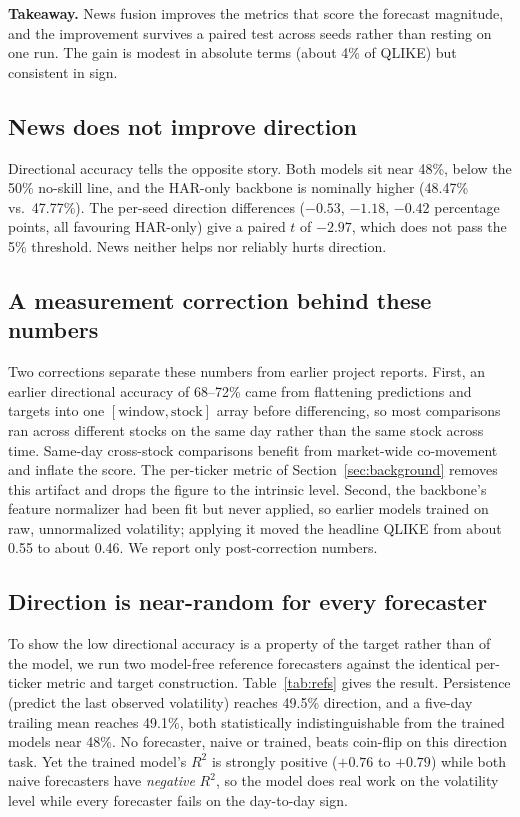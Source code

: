 \documentclass[runningheads]{llncs}
\newcommand{\diraccHAR}{48.47}
\newcommand{\diraccNews}{47.77}
\newcommand{\diracctstat}{-2.97}
\begin{document}
\smallskip
\noindent\textbf{Takeaway.} News fusion improves the metrics that score the forecast magnitude, and
the improvement survives a paired test across seeds rather than resting on one run. The gain is
modest in absolute terms (about 4\% of QLIKE) but consistent in sign.

\subsection{News does not improve direction}
Directional accuracy tells the opposite story. Both models sit near 48\%, below the 50\% no-skill
line, and the HAR-only backbone is nominally higher (\diraccHAR\% vs.\ \diraccNews\%). The per-seed
direction differences ($-0.53$, $-1.18$, $-0.42$ percentage points, all favouring HAR-only) give a
paired $t$ of $\diracctstat$, which does not pass the 5\% threshold. News neither helps nor
reliably hurts direction.

\subsection{A measurement correction behind these numbers}
Two corrections separate these numbers from earlier project reports. First, an earlier directional
accuracy of 68--72\% came from flattening predictions and targets into one $[\text{window},
\text{stock}]$ array before differencing, so most comparisons ran across different stocks on the
same day rather than the same stock across time. Same-day cross-stock comparisons benefit from
market-wide co-movement and inflate the score. The per-ticker metric of
Section~\ref{sec:background} removes this artifact and drops the figure to the intrinsic level.
Second, the backbone's feature normalizer had been fit but never applied, so earlier models trained
on raw, unnormalized volatility; applying it moved the headline QLIKE from about 0.55 to about
0.46. We report only post-correction numbers.

\subsection{Direction is near-random for every forecaster}
\label{sec:refbaselines}
To show the low directional accuracy is a property of the target rather than of the model, we run
two model-free reference forecasters against the identical per-ticker metric and target
construction. Table~\ref{tab:refs} gives the result. Persistence (predict the last observed
volatility) reaches 49.5\% direction, and a five-day trailing mean reaches 49.1\%, both
statistically indistinguishable from the trained models near 48\%. No forecaster, naive or trained,
beats coin-flip on this direction task. Yet the trained model's $R^2$ is strongly positive
($+0.76$ to $+0.79$) while both naive forecasters have \emph{negative} $R^2$, so the model does
real work on the volatility level while every forecaster fails on the day-to-day sign.
\end{document}
